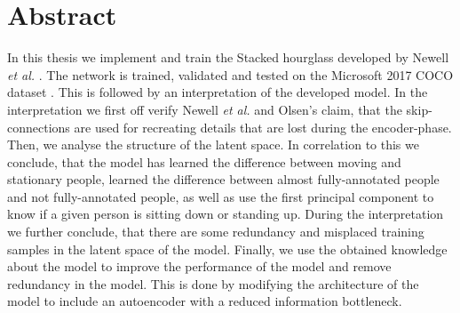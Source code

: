 \documentclass[./main.tex]{subfiles}
\begin{document}
\section*{Abstract}
In this thesis we implement and train the Stacked hourglass developed by Newell \textit{et al.} \cite{Newell}. The network is trained, validated and tested on the Microsoft 2017 COCO dataset \cite{COCO_article}. This is followed by an interpretation of the developed model. In the interpretation we first off verify Newell \textit{et al.} \cite{Newell} and Olsen's \cite{Camilla} claim, that the skip-connections are used for recreating details that are lost during the encoder-phase. Then, we analyse the structure of the latent space. In correlation to this we conclude, that the model has learned the difference between moving and stationary people, learned the difference between almost fully-annotated people and not fully-annotated people, as well as use the first principal component to know if a given person is sitting down or standing up. During the interpretation we further conclude, that there are some redundancy and misplaced training samples in the latent space of the model. Finally, we use the obtained knowledge about the model to improve the performance of the model and remove redundancy in the model. This is done by modifying the architecture of the model to include an autoencoder with a reduced information bottleneck. 
\end{document}
